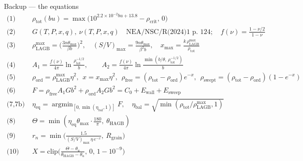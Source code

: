 \documentclass[10pt,aspectratio=169]{beamer}
\begin{document}
\begin{frame}{Backup --- the equations}
  \scriptsize
  \begin{align*}
    \text{(1)}\;\; & \rho_{\text{tot}}(bu) = \max\!\big(10^{2.2\times10^{-2} bu + 13.8}-\rho_{\text{crit}},\,0\big) \\
    \text{(2)}\;\; & G(T,P,x,q),\ \nu(T,P,x,q) \quad \text{NEA/NSC/R(2024)1 p.\ 124};\quad f(\nu) = \tfrac{1-\nu/2}{1-\nu} \\
    \text{(3)}\;\; & \rho^{\max}_{\text{LAGB}} = \Big(\tfrac{3n\theta_{\max}}{\beta b}\Big)^2,\quad
                     (S/V)_{\max} = \tfrac{9n\theta_{\max}}{\beta^2 b},\quad
                     x_{\max} = \tfrac{k\,\rho^{\max}_{\text{LAGB}}}{\rho_{\text{tot}}} \\
    \text{(4)}\;\; & A_1 = \tfrac{f(\nu)}{4\pi}\ln\tfrac{\rho_{\text{tot}}^{-1/2}}{b},\qquad
                     A_2 = \tfrac{f(\nu)}{4\pi}\ln\tfrac{\min(b/\theta,\,\rho_{\text{tot}}^{-1/2})}{b} \\
    \text{(5)}\;\; & \rho_{\text{ord}} = \rho^{\max}_{\text{LAGB}}\eta^2,\ \ x = x_{\max}\eta^2,\ \
                     \rho_{\text{free}} = (\rho_{\text{tot}}-\rho_{\text{ord}})e^{-x},\ \
                     \rho_{\text{swept}} = (\rho_{\text{tot}}-\rho_{\text{ord}})(1-e^{-x}) \\
    \text{(6)}\;\; & F = \rho_{\text{free}}A_1Gb^2 + \rho_{\text{ord}}A_2Gb^2 = C_0 + E_{\text{wall}} + E_{\text{sweep}} \\
    \text{(7,7b)}\;& \eta_{\text{eq}} = \operatorname{argmin}_{[0,\min(\eta_{\text{bal}},1)]}F,\quad
                     \eta_{\text{bal}} = \sqrt{\min(\rho_{\text{tot}}/\rho^{\max}_{\text{LAGB}},1)} \\
    \text{(8)}\;\; & \Theta = \min(\eta_{\text{eq}}\theta_{\max}\cdot\tfrac{180}{\pi},\ \theta_{\text{HAGB}}) \\
    \text{(9)}\;\; & r_n = \min\!\big(\tfrac{1.5}{(S/V)_{\max}\,\eta\,e^{-x}},\ R_{\text{grain}}\big) \\
    \text{(10)}\;\;& X = \mathrm{clip}\big(\tfrac{\Theta-\theta_u}{\theta_{\text{HAGB}}-\theta_u},\,0,\,1-10^{-9}\big)
  \end{align*}
\end{frame}
\end{document}
